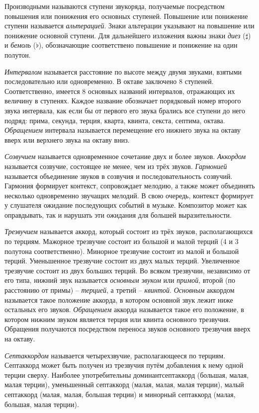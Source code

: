 Производными называются ступени звукоряда, получаемые посредством повышения или
понижения его основных ступеней. Повышение или понижение ступени называется
\emph{альтерацией}. Знаки альтерации указывают на повышение или понижение
основной ступени. Для дальнейшего изложения важны знаки \emph{диез} ($\sharp$) и
\emph{бемоль} ($\flat$), обозначающие соответствено повышение и понижение на
один полутон.

\emph{Интервалом} называется расстояние по высоте между двумя звуками, взятыми
последовательно или одновременно. В октаве заключено 8 ступеней. Соответственно,
имеется 8 основных названий интервалов, отражающих их величину в ступенях.
Каждое название обозначает порядковый номер второго звука интервала, как если бы
от первого его звука брались все ступени до него подряд: прима, секунда, терция,
кварта, квинта, секста, септима, октава. \emph{Обращением} интервала называется
перемещение его нижнего звука на октаву вверх или верхнего звука на октаву вниз.

\emph{Созвучием} называется одновременное сочетание двух и более звуков.
\emph{Аккордом} называется созвучие, состоящее не менее, чем из трёх звуков.
\emph{Гармонией} называется объединение звуков в созвучия и последовательность
созвучий. Гармония формирует контекст, сопровождает мелодию, а также может
объединять несколько одновременно звучащих мелодий. В свою очередь, контекст
формирует у слушателя ожидание последующих событий в музыке. Композитор может
как оправдывать, так и нарушать эти ожидания для большей выразительности.

\emph{Трезвучием} называется аккорд, который состоит из трёх звуков,
располагающихся по терциям. Мажорное трезвучие состоит из большой и малой терций
(4 и 3 полутона соответственно). Минорное трезвучие состоит из малой и большой
терций. Уменьшенное трезвучие состоит из двух малых терций. Увеличенное
трезвучие состоит из двух больших терций. Во всяком трезвучии, независимо от его
типа, нижний звук называется \emph{основным звуком} или \emph{примой}, второй
(по расстоянию от примы) -- \emph{терцией}, а третий -- \emph{квинтой}.
\emph{Основным} аккордом называется такое положение аккорда, в котором основной
звук лежит ниже остальных его звуков. \emph{Обращением} аккорда называется такое
его положение, в котором нижним звуком является терция или квинта основного
трезвучия. Обращения получаются посредством переноса звуков основного трезвучия
вверх на октаву.

\emph{Септаккордом} называется четырехзвучие, располагающееся по терциям.
Септаккорд может быть получен из трезвучия путём добавления к нему одной терции
сверху. Наиболее употребительны доминантсептаккорд (большая, малая, малая
терции), уменьшенный септаккорд (малая, малая, малая терции), малый септаккорд
(малая, малая, большая терции) и минорный септаккорд (малая, большая, малая
терции).

